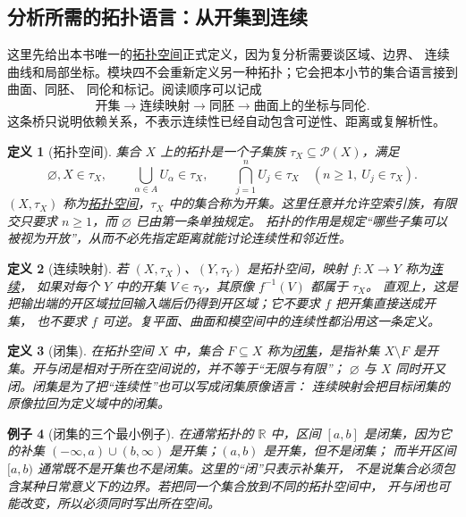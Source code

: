 \documentclass[UTF8,fontset=none,a4paper,11pt]{ctexart}
\theoremstyle{foundation-definition}
\newtheorem{definition}{定义}[section]
\theoremstyle{foundation-theorem}
\theoremstyle{foundation-proposition}
\theoremstyle{foundation-example}
\newtheorem{example}[definition]{例子}
\theoremstyle{foundation-remark}
\theoremstyle{foundation-theorem}
\newcommand{\term}[2]{\hyperref[#1]{#2}}
\begin{document}
\subsection{分析所需的拓扑语言：从开集到连续}

这里先给出本书唯一的\term{def:topology}{拓扑空间}正式定义，因为复分析需要谈区域、边界、
连续曲线和局部坐标。模块四不会重新定义另一种拓扑；它会把本小节的集合语言接到曲面、同胚、
同伦和标记。阅读顺序可以记成
\[
\text{开集}\longrightarrow\text{连续映射}\longrightarrow\text{同胚}
\longrightarrow\text{曲面上的坐标与同伦}.
\]
这条桥只说明依赖关系，不表示连续性已经自动包含可逆性、距离或复解析性。

\begin{definition}[拓扑空间]\label{def:topology}
集合 \(X\) 上的拓扑是一个子集族 \(\tau_X\subseteq\mathcal P(X)\)，满足
\[
\varnothing,X\in\tau_X,\qquad
\bigcup_{\alpha\in A}U_\alpha\in\tau_X,\qquad
\bigcap_{j=1}^{n}U_j\in\tau_X\quad(n\geq1,\ U_j\in\tau_X).
\]
\((X,\tau_X)\) 称为\term{def:topology}{拓扑空间}，\(\tau_X\) 中的集合称为开集。这里任意并允许空索引族，有限交只要求 \(n\geq1\)，而 \(\varnothing\) 已由第一条单独规定。
拓扑的作用是规定“哪些子集可以被视为开放”，从而不必先指定距离就能讨论连续性和邻近性。
\end{definition}

\begin{definition}[连续映射]\label{def:continuous-map}
若 \((X,\tau_X)\)、\((Y,\tau_Y)\) 是拓扑空间，映射 \(f:X\to Y\) 称为\term{def:continuous-map}{连续}，
如果对每个 \(Y\) 中的开集 \(V\in\tau_Y\)，其原像 \(f^{-1}(V)\) 都属于 \(\tau_X\)。
直观上，这是把输出端的开区域拉回输入端后仍得到开区域；它不要求 \(f\) 把开集直接送成开集，
也不要求 \(f\) 可逆。复平面、曲面和模空间中的连续性都沿用这一条定义。
\end{definition}

\begin{definition}[闭集]\label{def:closed-set}
在拓扑空间 \(X\) 中，集合 \(F\subseteq X\) 称为\term{def:closed-set}{闭集}，是指补集
\(X\setminus F\) 是开集。开与闭是相对于所在空间说的，并不等于“无限与有限”；
\(\varnothing\) 与 \(X\) 同时开又闭。闭集是为了把“连续性”也可以写成闭集原像语言：
连续映射会把目标闭集的原像拉回为定义域中的闭集。
\end{definition}

\begin{example}[闭集的三个最小例子]\label{ex:closed-set-basic}
在通常拓扑的 \(\mathbb R\) 中，区间 \([a,b]\) 是闭集，因为它的补集
 \((-\infty,a)\cup(b,\infty)\) 是开集；\((a,b)\) 是开集，但不是闭集；
而半开区间 \([a,b)\) 通常既不是开集也不是闭集。这里的“闭”只表示补集开，
不是说集合必须包含某种日常意义下的边界。若把同一个集合放到不同的拓扑空间中，
开与闭也可能改变，所以必须同时写出所在空间。
\end{example}
\end{document}
